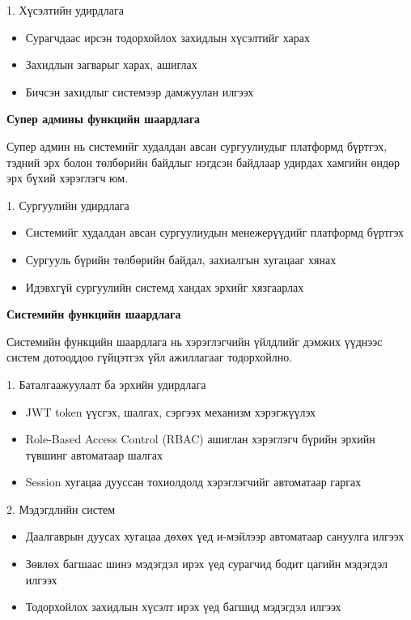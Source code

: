 1. Хүсэлтийн удирдлага
\begin{itemize}
    \item Сурагчдаас ирсэн тодорхойлох захидлын хүсэлтийг харах
    \item Захидлын загварыг харах, ашиглах
    \item Бичсэн захидлыг системээр дамжуулан илгээх
\end{itemize}

\textbf{Супер админы функцийн шаардлага}

Супер админ нь системийг худалдан авсан сургуулиудыг платформд
бүртгэх, тэдний эрх болон төлбөрийн байдлыг нэгдсэн байдлаар
удирдах хамгийн өндөр эрх бүхий хэрэглэгч юм.

1. Сургуулийн удирдлага
\begin{itemize}
    \item Системийг худалдан авсан сургуулиудын менежерүүдийг
    платформд бүртгэх
    \item Сургууль бүрийн төлбөрийн байдал, захиалгын хугацааг
    хянах
    \item Идэвхгүй сургуулийн системд хандах эрхийг хязгаарлах
\end{itemize}

\textbf{Системийн функцийн шаардлага}

Системийн функцийн шаардлага нь хэрэглэгчийн үйлдлийг дэмжих
үүднээс систем дотооддоо гүйцэтгэх үйл ажиллагааг тодорхойлно.

1. Баталгаажуулалт ба эрхийн удирдлага
\begin{itemize}
    \item JWT token үүсгэх, шалгах, сэргээх механизм хэрэгжүүлэх
    \item Role-Based Access Control (RBAC) ашиглан хэрэглэгч
    бүрийн эрхийн түвшинг автоматаар шалгах
    \item Session хугацаа дууссан тохиолдолд хэрэглэгчийг
    автоматаар гаргах
\end{itemize}

2. Мэдэгдлийн систем
\begin{itemize}
    \item Даалгаврын дуусах хугацаа дөхөх үед и-мэйлээр
    автоматаар сануулга илгээх
    \item Зөвлөх багшаас шинэ мэдэгдэл ирэх үед сурагчид
    бодит цагийн мэдэгдэл илгээх
    \item Тодорхойлох захидлын хүсэлт ирэх үед багшид
    мэдэгдэл илгээх
\end{itemize}

